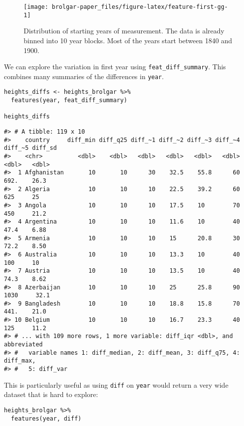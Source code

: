 \begin{figure}

{\centering \texttt{[image: brolgar-paper\_files/figure-latex/feature-first-gg-1]} 

}

\caption{Distribution of starting years of measurement. The data is already binned into 10 year blocks. Most of the years start between 1840 and 1900.}\label{fig:feature-first-gg}
\end{figure}

We can explore the variation in first year using \texttt{feat\_diff\_summary}. This combines many summaries of the differences in \texttt{year}.

\begin{verbatim}
heights_diffs <- heights_brolgar %>% 
  features(year, feat_diff_summary)

heights_diffs
\end{verbatim}

\begin{verbatim}
#> # A tibble: 119 x 10
#>    country     diff_min diff_q25 diff_~1 diff_~2 diff_~3 diff_~4 diff_~5 diff_sd
#>    <chr>          <dbl>    <dbl>   <dbl>   <dbl>   <dbl>   <dbl>   <dbl>   <dbl>
#>  1 Afghanistan       10       10      30    32.5    55.8      60   692.    26.3 
#>  2 Algeria           10       10      10    22.5    39.2      60   625     25   
#>  3 Angola            10       10      10    17.5    10        70   450     21.2 
#>  4 Argentina         10       10      10    11.6    10        40    47.4    6.88
#>  5 Armenia           10       10      10    15      20.8      30    72.2    8.50
#>  6 Australia         10       10      10    13.3    10        40   100     10   
#>  7 Austria           10       10      10    13.5    10        40    74.3    8.62
#>  8 Azerbaijan        10       10      10    25      25.8      90  1030     32.1 
#>  9 Bangladesh        10       10      10    18.8    15.8      70   441.    21.0 
#> 10 Belgium           10       10      10    16.7    23.3      40   125     11.2 
#> # ... with 109 more rows, 1 more variable: diff_iqr <dbl>, and abbreviated
#> #   variable names 1: diff_median, 2: diff_mean, 3: diff_q75, 4: diff_max,
#> #   5: diff_var
\end{verbatim}

This is particularly useful as using \texttt{diff} on \texttt{year} would return a very wide dataset that is hard to explore:

\begin{verbatim}
heights_brolgar %>% 
  features(year, diff)
\end{verbatim}

